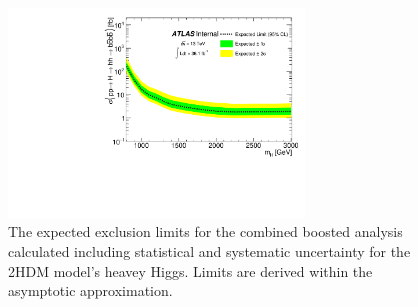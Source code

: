 \begin{figure}
\begin{center}
\includegraphics[width=0.7\textwidth,angle=-90]{figures/boosted/Limit_Stat/BrazilPlot_Asymptotic_2HDM_merged.pdf}
\caption{The expected exclusion limits for the combined boosted analysis calculated including statistical and systematic uncertainty for the 2HDM model's heavey Higgs. Limits are derived within the asymptotic approximation.}
\label{fig:brazil_hh_boosted_all_2HDM_syst}
\end{center}
\end{figure}




